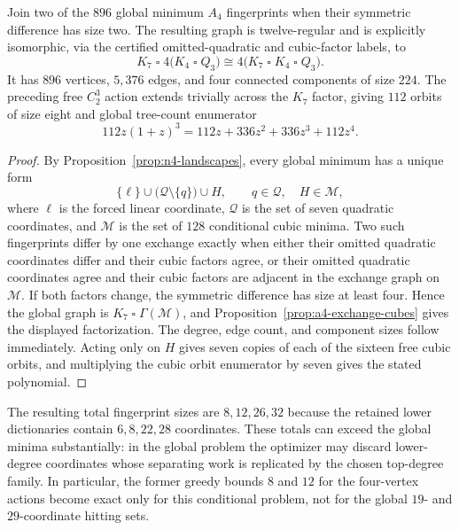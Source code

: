 \begin{corollary}
\label{cor:a4-global-exchange}
Join two of the $896$ global minimum $A_4$ fingerprints when their symmetric
difference has size two.  The resulting graph is twelve-regular and is
explicitly isomorphic, via the certified omitted-quadratic and cubic-factor
labels, to
\[
  K_7\mathbin{\square}
  4\bigl(K_4\mathbin{\square}Q_3\bigr)
  \cong
  4\bigl(K_7\mathbin{\square}K_4\mathbin{\square}Q_3\bigr).
\]
It has $896$ vertices, $5{,}376$ edges, and four connected components of size
$224$.  The preceding free $C_2^3$ action extends trivially across the $K_7$
factor, giving $112$ orbits of size eight and global tree-count enumerator
\[
  112z(1+z)^3=112z+336z^2+336z^3+112z^4.
\]
\end{corollary}

\begin{proof}
By Proposition~\ref{prop:n4-landscapes}, every global minimum has a unique
form
\[
  \{\ell\}\cup\bigl(\mathcal Q\setminus\{q\}\bigr)\cup H,
  \qquad q\in\mathcal Q,\quad H\in\mathcal M,
\]
where $\ell$ is the forced linear coordinate, $\mathcal Q$ is the set of seven
quadratic coordinates, and $\mathcal M$ is the set of $128$ conditional cubic
minima.  Two such fingerprints differ by one exchange exactly when either
their omitted quadratic coordinates differ and their cubic factors agree, or
their omitted quadratic coordinates agree and their cubic factors are
adjacent in the exchange graph on $\mathcal M$.  If both factors change, the
symmetric difference has size at least four.  Hence the global graph is
$K_7\mathbin{\square}\Gamma(\mathcal M)$, and
Proposition~\ref{prop:a4-exchange-cubes} gives the displayed factorization.
The degree, edge count, and component sizes follow immediately.  Acting only
on $H$ gives seven copies of each of the sixteen free cubic orbits, and
multiplying the cubic orbit enumerator by seven gives the stated polynomial.
\end{proof}

The resulting total fingerprint sizes are $8,12,26,32$ because the retained
lower dictionaries contain $6,8,22,28$ coordinates.  These totals can exceed
the global minima substantially: in the global problem the optimizer may
discard lower-degree coordinates whose separating work is replicated by the
chosen top-degree family.  In particular, the former greedy bounds $8$ and
$12$ for the four-vertex actions become exact only for this conditional
problem, not for the global $19$- and $29$-coordinate hitting sets.

